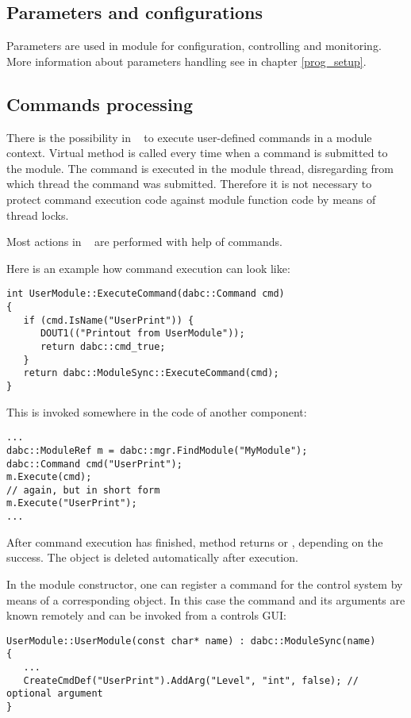\subsection{Parameters and configurations}

Parameters are used in module for configuration, controlling and monitoring.
More information about parameters handling see in chapter \ref{prog_setup}.


\subsection{Commands processing}

There is the possibility in \dabc~ to execute user-defined commands in a module context.
Virtual method  is called every time when a command is submitted
to the module. The command is  executed in the module thread,
disregarding from which thread the command was submitted. 
Therefore it is not necessary to protect command execution code against
module function code by means of thread locks.

Most actions in \dabc~ are performed with help of commands. 

Here is an example how command execution can look like:
\begin{small}
\begin{verbatim}
int UserModule::ExecuteCommand(dabc::Command cmd) 
{
   if (cmd.IsName("UserPrint")) {
      DOUT1(("Printout from UserModule"));
      return dabc::cmd_true;
   }
   return dabc::ModuleSync::ExecuteCommand(cmd);
}
\end{verbatim}
\end{small}

This is invoked somewhere in the code of another component:
\begin{small}
\begin{verbatim}
...
dabc::ModuleRef m = dabc::mgr.FindModule("MyModule"); 
dabc::Command cmd("UserPrint");
m.Execute(cmd);
// again, but in short form
m.Execute("UserPrint");
...
\end{verbatim}
\end{small}
After command execution has finished, 
method  returns  or  ,
depending on the success. The  object 
is deleted automatically after execution.  

In the module constructor, one can register a command 
for the control system by means of a corresponding 
 object. 
In this case the command and its arguments are known
remotely and can be invoked from a controls GUI:
\begin{small}
\begin{verbatim}
UserModule::UserModule(const char* name) : dabc::ModuleSync(name) 
{
   ...
   CreateCmdDef("UserPrint").AddArg("Level", "int", false); // optional argument
}
\end{verbatim}
\end{small}



